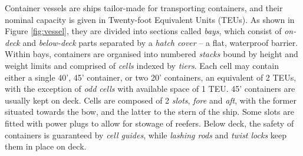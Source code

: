 \documentclass[preprint,11pt,3p]{elsarticle}
\begin{document}
Container vessels are ships tailor-made for transporting containers, and their nominal capacity is given in Twenty-foot Equivalent Units (TEUs). As shown in Figure \ref{fig:vessel}, they are divided into sections called \textit{bays}, which consist of \textit{on-deck} and \textit{below-deck} parts separated by a \textit{hatch cover} -- a flat, waterproof barrier. Within bays, containers are organised into numbered \textit{stacks} bound by height and weight limits and comprised of \textit{cells} indexed by \textit{tiers}. Each cell may contain either a single 40', 45' container, or two 20' containers, an equivalent of 2 TEUs, with the exception of \textit{odd cells} with available space of 1 TEU. 45' containers are usually kept on deck. Cells are composed of 2 \textit{slots}, \textit{fore} and \textit{aft}, with the former situated towards the bow, and the latter to the stern of the ship. Some slots are fitted with power plugs to allow for stowage of reefers. Below deck, the safety of containers is guaranteed by \textit{cell guides}, while \textit{lashing rods} and \textit{twist locks} keep them in place on deck.
\end{document}
